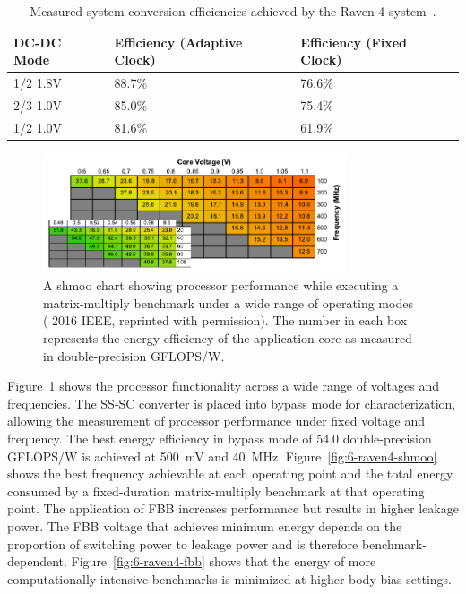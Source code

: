 \documentclass[graybox]{svmult}
\begin{document}
\begin{table}[t]
\footnotesize
\renewcommand{\arraystretch}{1.2}
\centering
\begin{tabular}{@{}lll@{}}
\toprule
\textbf{DC-DC Mode} & \textbf{Efficiency (Adaptive Clock)} & \textbf{Efficiency (Fixed Clock)} \\
\midrule
1/2 1.8V & 88.7\% & 76.6\% \\
2/3 1.0V & 85.0\% & 75.4\% \\
1/2 1.0V & 81.6\% & 61.9\% \\
\bottomrule
\hline
\end{tabular}
\caption{Measured system conversion efficiencies achieved by the Raven-4 system~\cite{Keller2017}.}
\label{tab:raven4-efficiency}
\end{table}

\begin{figure}
  \centering
  \includegraphics[width=0.8\textwidth]{6-raven4-shmoochart}
  \caption{A shmoo chart showing processor performance while executing a matrix-multiply benchmark under a wide range of operating modes~\cite{Keller2016} ({\textcopyright} 2016 IEEE, reprinted with permission). The number in each box represents the energy efficiency of the application core as measured in double-precision GFLOPS/W.}
  \label{fig:6-raven4-shmoochart}
\end{figure}

Figure~\ref{fig:6-raven4-shmoochart} shows the processor functionality across a wide range of voltages and frequencies.
The SS-SC converter is placed into bypass mode for characterization, allowing the measurement of processor performance under fixed voltage and frequency.
The best energy efficiency in bypass mode of 54.0 double-precision GFLOPS/W is achieved at \SI{500}{\milli\volt} and \SI{40}{\mega\hertz}.
Figure~\ref{fig:6-raven4-shmoo} shows the best frequency achievable at each operating point and the total energy consumed by a fixed-duration matrix-multiply benchmark at that operating point.
The application of FBB increases performance but results in higher leakage power.
The FBB voltage that achieves minimum energy depends on the proportion of switching power to leakage power and is therefore benchmark-dependent.
Figure~\ref{fig:6-raven4-fbb} shows that the energy of more computationally intensive benchmarks is minimized at higher body-bias settings.
\end{document}
